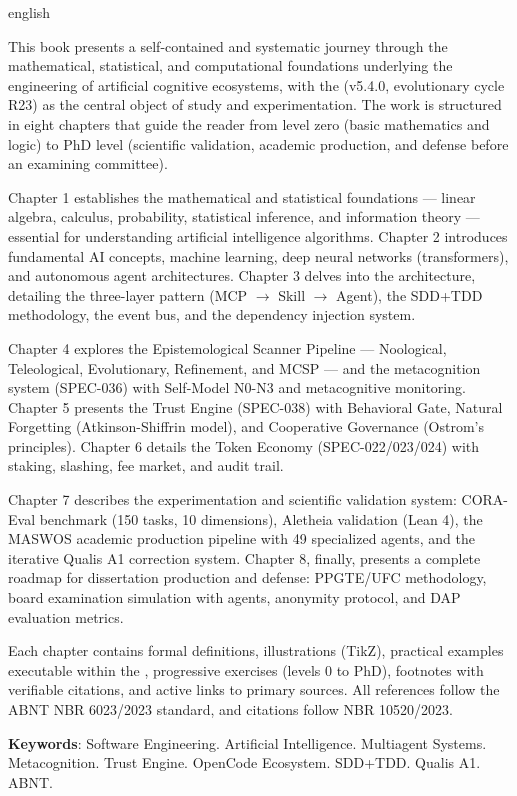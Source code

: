 \begin{resumo}[Abstract]
    \begin{otherlanguage*}{english}

This book presents a self-contained and systematic journey through the 
mathematical, statistical, and computational foundations underlying the 
engineering of artificial cognitive ecosystems, with the \opencodeeco{} 
(v5.4.0, evolutionary cycle R23) as the central object of study and 
experimentation. The work is structured in eight chapters that guide the 
reader from level zero (basic mathematics and logic) to PhD level 
(scientific validation, \qualisA{} academic production, and defense 
before an examining committee).

Chapter 1 establishes the mathematical and statistical foundations --- 
linear algebra, calculus, probability, statistical inference, and 
information theory --- essential for understanding artificial intelligence 
algorithms. Chapter 2 introduces fundamental AI concepts, machine learning, 
deep neural networks (transformers), and autonomous agent architectures. 
Chapter 3 delves into the \opencodeeco{} architecture, detailing the 
three-layer pattern (MCP $\rightarrow$ Skill $\rightarrow$ Agent), the 
SDD+TDD methodology, the event bus, and the dependency injection system.

Chapter 4 explores the Epistemological Scanner Pipeline --- Noological, 
Teleological, Evolutionary, Refinement, and MCSP --- and the metacognition 
system (SPEC-036) with Self-Model N0-N3 and metacognitive monitoring. 
Chapter 5 presents the Trust Engine (SPEC-038) with Behavioral Gate, 
Natural Forgetting (Atkinson-Shiffrin model), and Cooperative Governance 
(Ostrom's principles). Chapter 6 details the Token Economy 
(SPEC-022/023/024) with staking, slashing, fee market, and audit trail.

Chapter 7 describes the experimentation and scientific validation system: 
CORA-Eval benchmark (150 tasks, 10 dimensions), Aletheia validation 
(Lean 4), the MASWOS academic production pipeline with 49 specialized 
agents, and the iterative Qualis A1 correction system. Chapter 8, 
finally, presents a complete roadmap for dissertation production and 
defense: PPGTE/UFC methodology, board examination simulation with agents, 
anonymity protocol, and DAP evaluation metrics.

Each chapter contains formal definitions, illustrations (TikZ), practical 
examples executable within the \opencodeeco{}, progressive exercises 
(levels 0 to PhD), footnotes with verifiable citations, and active links 
to primary sources. All references follow the ABNT NBR 6023/2023 standard, 
and citations follow NBR 10520/2023.

\textbf{Keywords}: Software Engineering. Artificial Intelligence. 
Multiagent Systems. Metacognition. Trust Engine. OpenCode Ecosystem. 
SDD+TDD. Qualis A1. ABNT.

    \end{otherlanguage*}
\end{resumo}
